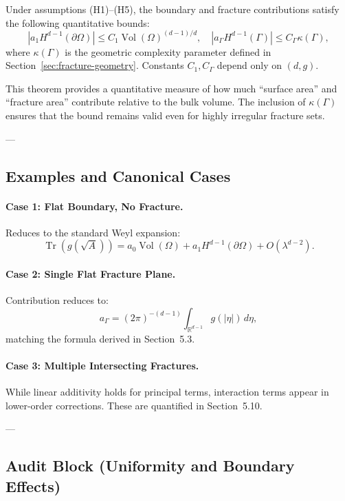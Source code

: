 \begin{theorem}
\label{thm:uniform-boundary}
Under assumptions (H1)--(H5), 
the boundary and fracture contributions satisfy the following quantitative bounds:
\[
|a_1 H^{d-1}(\partial\Omega)| \leq C_1 \operatorname{Vol}(\Omega)^{(d-1)/d}, 
\quad
|a_\Gamma H^{d-1}(\Gamma)| \leq C_\Gamma \kappa(\Gamma),
\]
where $\kappa(\Gamma)$ is the geometric complexity parameter defined in Section~\ref{sec:fracture-geometry}.
Constants $C_1, C_\Gamma$ depend only on $(d,g)$.
\end{theorem}

\begin{remark}
This theorem provides a quantitative measure of how much ``surface area'' 
and ``fracture area'' contribute relative to the bulk volume.  
The inclusion of $\kappa(\Gamma)$ ensures that the bound 
remains valid even for highly irregular fracture sets.
\end{remark}

---

\subsection{Examples and Canonical Cases}

\paragraph{Case 1: Flat Boundary, No Fracture.}  
Reduces to the standard Weyl expansion:
\[
\operatorname{Tr}(g(\sqrt{A})) 
= a_0 \operatorname{Vol}(\Omega) + a_1 H^{d-1}(\partial\Omega) + O(\lambda^{d-2}).
\]

\paragraph{Case 2: Single Flat Fracture Plane.}  
Contribution reduces to:
\[
a_\Gamma = (2\pi)^{-(d-1)} \int_{\mathbb{R}^{d-1}} g(|\eta|) \, d\eta,
\]
matching the formula derived in Section~5.3.

\paragraph{Case 3: Multiple Intersecting Fractures.}  
While linear additivity holds for principal terms, 
interaction terms appear in lower-order corrections.  
These are quantified in Section~5.10.

---

\subsection{Audit Block (Uniformity and Boundary Effects)}

